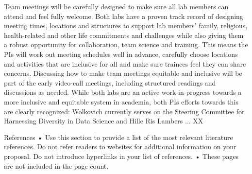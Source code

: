 \documentclass[11pt]{article}
\begin{document}
Team meetings will be carefully designed to make sure all lab members can attend and feel fully welcome. Both labs have a proven track record of designing meeting times, locations and structures to support lab members' family, religious, health-related and other life commitments and challenges while also giving them a robust opportunity for collaboration, team science and training. This means the PIs will work out meeting schedules well in advance, carefully choose locations and activities that are inclusive for all and make sure trainees feel they can share concerns. Discussing how to make team meetings equitable and inclusive  will be part of the early video-call meetings, including structured readings and discussions as needed. While both labs are an active work-in-progress towards a more inclusive and equitable system in academia, both PIs efforts towards this are clearly recognized: Wolkovich currently serves on the Steering Committee for Harnessing Diversity in Data Science and Hille Ris Lambers ... XX %

References %
•	Use this section to provide a list of the most relevant literature references. Do not refer readers to websites for additional information on your proposal. Do not introduce hyperlinks in your list of references.
•	These pages are not included in the page count.

\end{document}
